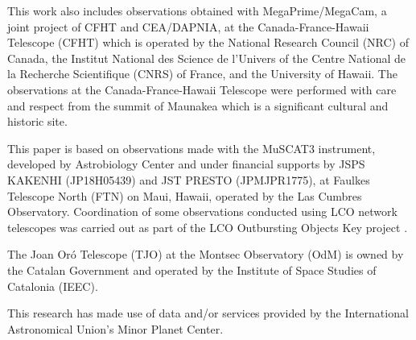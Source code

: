 \documentclass[twocolumn,longbib]{aastex7}
\begin{document}
\begin{CJK*}{UTF8}{gbsn}
\begin{acknowledgments}
This work also includes observations obtained with MegaPrime/MegaCam, a joint project of CFHT and CEA/DAPNIA, at the Canada-France-Hawaii Telescope (CFHT) which is operated by the National Research Council (NRC) of Canada, the Institut National des Science de l'Univers of the Centre National de la Recherche Scientifique (CNRS) of France, and the University of Hawaii. The observations at the Canada-France-Hawaii Telescope were performed with care and respect from the summit of Maunakea which is a significant cultural and historic site.

This paper is based on observations made with the MuSCAT3 instrument, developed by Astrobiology Center and under financial supports by JSPS KAKENHI (JP18H05439) and JST PRESTO (JPMJPR1775), at Faulkes Telescope North (FTN) on Maui, Hawaii, operated by the Las Cumbres Observatory.  Coordination of some observations conducted using LCO network telescopes was carried out as part of the LCO Outbursting Objects Key project \citep[LOOK;][]{lister2022_look}.

The Joan Or\'{o} Telescope (TJO) at the Montsec Observatory (OdM) is owned by the Catalan Government and operated by the Institute of Space Studies of Catalonia (IEEC).

This research has made use of data and/or services provided by the International Astronomical Union's Minor Planet Center.

\end{acknowledgments}


\begin{contribution}



\end{contribution}
\end{CJK*}
\end{document}
